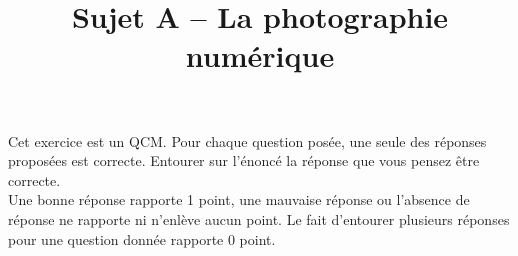 \documentclass[a4paper]{article}
\begin{document}
\title{Sujet A -- La photographie numérique}

\pagestyle{empty}

\date{}
\author{}

\maketitle{}
\thispagestyle{empty}

\exo[4 points] Cet exercice est un QCM. Pour chaque question posée, une seule des réponses proposées est correcte. Entourer sur l'énoncé la réponse que vous pensez être correcte.\\
Une bonne réponse rapporte 1 point, une mauvaise réponse ou l'absence de réponse ne rapporte  ni n'enlève aucun point. Le fait d'entourer plusieurs réponses pour une question donnée rapporte 0 point.
\end{document}
